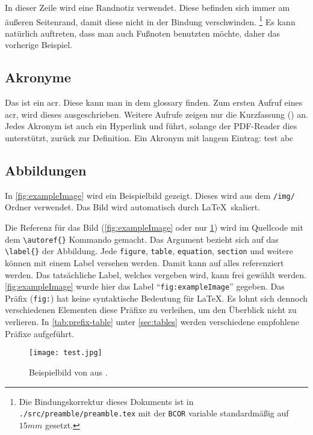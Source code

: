 In dieser Zeile wird eine Randnotiz verwendet.
Diese befinden sich immer am äußeren Seitenrand, damit diese nicht in der Bindung verschwinden.
\footnote{Die Bindungskorrektur dieses Dokuments ist in \texttt{./src/preamble/preamble.tex} mit der \texttt{BCOR} variable standardmäßig auf $15\si{mm}$ gesetzt.}
Es kann natürlich auftreten, dass man auch Fußnoten benutzten möchte, daher das vorherige Beispiel.

\subsection{Akronyme}

Das ist ein \gls{acr}.
Diese kann man in dem \gls{glossary} finden.
Zum ersten Aufruf eines \gls{acr}, wird dieses ausgeschrieben.
Weitere Aufrufe zeigen nur die Kurzfassung () an.
Jedes Akronym ist auch ein Hyperlink und führt, solange der PDF-Reader dies unterstützt, zurück zur Definition.
Ein Akronym mit langem Eintrag: \gls{test} \gls{abc}

\subsection{Abbildungen}

In \autoref{fig:exampleImage} wird ein Beispielbild gezeigt.
Dieses wird aus dem \texttt{/img/} Ordner verwendet.
Das Bild wird automatisch durch \LaTeX\ skaliert.

Die Referenz für das Bild (\autoref{fig:exampleImage} oder nur \ref{fig:exampleImage}) wird im Quellcode mit dem \texttt{\textbackslash autoref\{\}} Kommando gemacht.
Das Argument bezieht sich auf das \texttt{\textbackslash label\{\}} der Abbildung.
Jede \texttt{figure}, \texttt{table}, \texttt{equation}, \texttt{section} und weitere können mit einem Label versehen werden.
Damit kann auf alles referenziert werden.
Das tatsächliche Label, welches vergeben wird, kann frei gewählt werden.
\autoref{fig:exampleImage} wurde hier das Label \enquote{\texttt{fig:exampleImage}} gegeben.
Das Präfix (\texttt{fig:}) hat keine syntaktische Bedeutung für \LaTeX.
Es lohnt sich dennoch verschiedenen Elementen diese Präfixe zu verleihen, um den Überblick nicht zu verlieren.
In \autoref{tab:prefix-table} unter \autoref{sec:tables} werden verschiedene empfohlene Präfixe aufgeführt.

\begin{figure}[ht]
    \centering
    \texttt{[image: test.jpg]}
    \caption[Beispielbild]{Beispielbild von \citeauthor{exampleImage} aus \autocite{exampleImage}.}
    \label{fig:exampleImage}
\end{figure}

